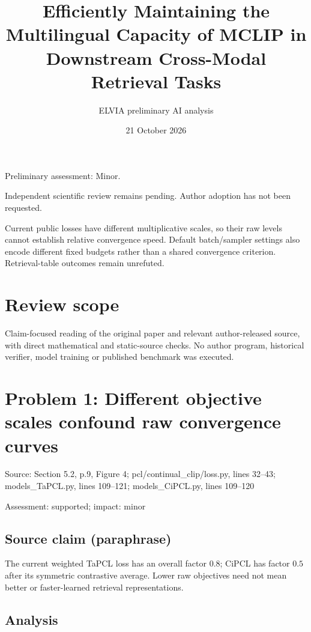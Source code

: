 \documentclass[11pt]{article}
\begin{document}
\title{Efficiently Maintaining the Multilingual Capacity of MCLIP in Downstream Cross-Modal Retrieval Tasks}

\author{ELVIA preliminary AI analysis}\date{21 October 2026}\maketitle

Preliminary assessment: Minor.\par

Independent scientific review remains pending. Author adoption has not been requested.

Current public losses have different multiplicative scales, so their raw levels cannot establish relative convergence speed. Default batch/sampler settings also encode different fixed budgets rather than a shared convergence criterion. Retrieval-table outcomes remain unrefuted.

\section*{Review scope}

Claim-focused reading of the original paper and relevant author-released source, with direct mathematical and static-source checks. No author program, historical verifier, model training or published benchmark was executed.

\section*{Problem 1: Different objective scales confound raw convergence curves}

Source: Section 5.2, p.9, Figure 4; pcl/continual\_clip/loss.py, lines 32–43; models\_TaPCL.py, lines 109–121; models\_CiPCL.py, lines 109–120

Assessment: supported; impact: minor

\subsection*{Source claim (paraphrase)}

The current weighted TaPCL loss has an overall factor \(0.8\); CiPCL has factor \(0.5\) after its symmetric contrastive average. Lower raw objectives need not mean better or faster-learned retrieval representations.

\subsection*{Analysis}
\end{document}
